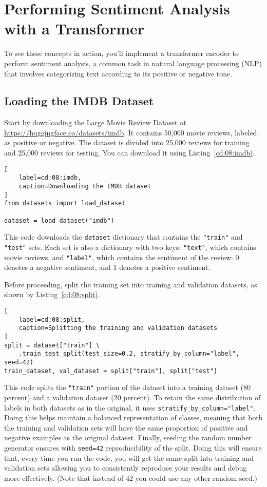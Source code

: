 \section{Performing Sentiment Analysis with a Transformer}

To see these concepts in action, you'll implement a transformer encoder to perform sentiment analysis, a common task in natural language processing (NLP) that involves categorizing text according to its positive or negative tone.

\subsection{Loading the IMDB Dataset}

Start by downloading the Large Movie Review Dataset at \url{https://huggingface.co/datasets/imdb}. It contains 50,000 movie reviews, labeled as positive or negative. The dataset is divided into 25,000 reviews for training and 25,000 reviews for testing. You can download it using Listing~\ref{cd:08:imdb}.
\begin{lstlisting}[
    label=cd:08:imdb,
    caption=Downloading the IMDB dataset
]
from datasets import load_dataset

dataset = load_dataset("imdb")
\end{lstlisting}
This code downloads the \lstinline{dataset} dictionary that contains the \lstinline{"train"} and \lstinline{"test"} sets. Each set is also a dictionary with two keys: \lstinline{"text"}, which contains movie reviews, and \lstinline{"label"}, which contains the sentiment of the review: 0 denotes a negative sentiment, and 1 denotes a positive sentiment.

Before proceeding, split the training set into training and validation datasets, as shown by Listing~\ref{cd:08:split}.
\begin{lstlisting}[
    label=cd:08:split,
    caption=Splitting the training and validation datasets
]
split = dataset["train"] \
    .train_test_split(test_size=0.2, stratify_by_column="label", seed=42)
train_dataset, val_dataset = split["train"], split["test"]
\end{lstlisting}
This code splits the \lstinline{"train"} portion of the dataset into a training dataset (80 percent) and a validation dataset (20 percent). To  retain the same distribution of labels in both datasets as in the original, it uses \lstinline{stratify_by_column="label"}. Doing this helps maintain a balanced representation of classes, meaning that both the training and validation sets will have the same proportion of positive and negative examples as the original dataset. 
Finally, seeding the random number generator ensures with \lstinline{seed=42} reproducibility of the split. Doing this will ensure that, every time you run the code, you will get the same split into training and validation sets allowing you to consistently reproduce your results and debug more effectively. (Note that instead of 42 you could use any other random seed.)

